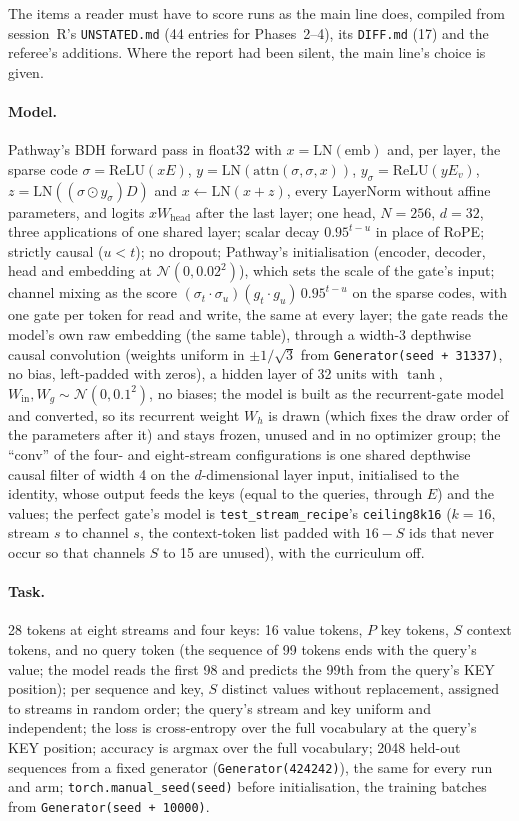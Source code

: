 \documentclass[11pt]{article}
\begin{document}
The items a reader must have to score runs as the main line does, compiled from session~R's \texttt{UNSTATED.md} (44 entries for Phases~2--4), its \texttt{DIFF.md} (17) and the referee's additions. Where the report had been silent, the main line's choice is given.

\paragraph{Model.} Pathway's BDH forward pass in float32 with $x = \mathrm{LN}(\mathrm{emb})$ and, per layer, the sparse code $\sigma = \mathrm{ReLU}(xE)$, $y = \mathrm{LN}(\mathrm{attn}(\sigma, \sigma, x))$, $y_\sigma = \mathrm{ReLU}(yE_v)$, $z = \mathrm{LN}((\sigma \odot y_\sigma)D)$ and $x \gets \mathrm{LN}(x + z)$, every LayerNorm without affine parameters, and logits $x W_{\mathrm{head}}$ after the last layer; one head, $N = 256$, $d = 32$, three applications of one shared layer; scalar decay $0.95^{t-u}$ in place of RoPE; strictly causal ($u < t$); no dropout; Pathway's initialisation (encoder, decoder, head and embedding at $\mathcal{N}(0, 0.02^2)$), which sets the scale of the gate's input; channel mixing as the score $(\sigma_t \cdot \sigma_u)(g_t \cdot g_u)\,0.95^{t-u}$ on the sparse codes, with one gate per token for read and write, the same at every layer; the gate reads the model's own raw embedding (the same table), through a width-3 depthwise causal convolution (weights uniform in $\pm 1/\sqrt{3}$ from \texttt{Generator(seed + 31337)}, no bias, left-padded with zeros), a hidden layer of 32 units with $\tanh$, $W_{\mathrm{in}}, W_g \sim \mathcal{N}(0, 0.1^2)$, no biases; the model is built as the recurrent-gate model and converted, so its recurrent weight $W_h$ is drawn (which fixes the draw order of the parameters after it) and stays frozen, unused and in no optimizer group; the ``conv'' of the four- and eight-stream configurations is one shared depthwise causal filter of width 4 on the $d$-dimensional layer input, initialised to the identity, whose output feeds the keys (equal to the queries, through $E$) and the values; the perfect gate's model is \texttt{test\_stream\_recipe}'s \texttt{ceiling8k16} ($k = 16$, stream $s$ to channel $s$, the context-token list padded with $16 - S$ ids that never occur so that channels $S$ to 15 are unused), with the curriculum off.

\paragraph{Task.} 28 tokens at eight streams and four keys: 16 value tokens, $P$ key tokens, $S$ context tokens, and no query token (the sequence of 99 tokens ends with the query's value; the model reads the first 98 and predicts the 99th from the query's KEY position); per sequence and key, $S$ distinct values without replacement, assigned to streams in random order; the query's stream and key uniform and independent; the loss is cross-entropy over the full vocabulary at the query's KEY position; accuracy is argmax over the full vocabulary; 2048 held-out sequences from a fixed generator (\texttt{Generator(424242)}), the same for every run and arm; \texttt{torch.manual\_seed(seed)} before initialisation, the training batches from \texttt{Generator(seed + 10000)}.
\end{document}
